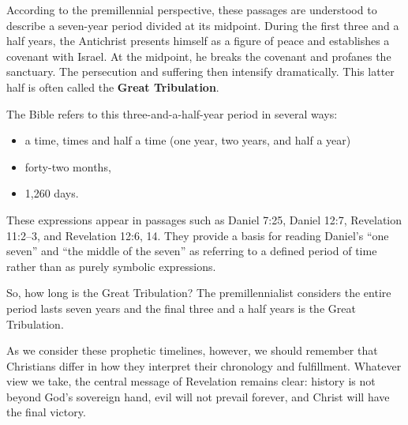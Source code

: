 According to the premillennial perspective, these passages are understood to describe a seven-year period divided at its midpoint. During the first three and a half years, the Antichrist presents himself as a figure of peace and establishes a covenant with Israel. At the midpoint, he breaks the covenant and profanes the sanctuary. The persecution and suffering then intensify dramatically. This latter half is often called the \textbf{Great Tribulation}.

The Bible refers to this three-and-a-half-year period in several ways: 
\begin{itemize}
\item a time, times and half a time (one year, two years, and half a year)
\item forty-two months,
\item 1,260 days.
\end{itemize}
These expressions appear in passages such as Daniel 7:25, Daniel 12:7, Revelation 11:2--3, and Revelation 12:6, 14.
They provide a basis for reading Daniel's ``one seven'' and ``the middle of the seven'' as referring to a defined period of time rather than as purely symbolic expressions.

So, how long is the Great Tribulation? The premillennialist considers the entire period lasts seven years and the final three and a half years is the Great Tribulation.

As we consider these prophetic timelines, however, we should remember that Christians differ in how they interpret their chronology and fulfillment. Whatever view we take, the central message of Revelation remains clear: history is not beyond God's sovereign hand, evil will not prevail forever, and Christ will have the final victory.